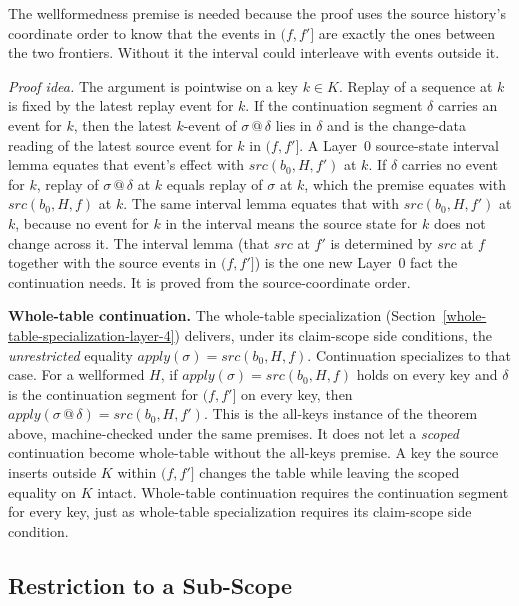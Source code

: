 \documentclass[letterpaper,10pt,twocolumn]{article}
\newcommand{\Apply}{\mathit{apply}}
\newcommand{\Src}{\mathit{src}}
\begin{document}
The wellformedness premise is needed because the proof uses the
source history's coordinate order to know that the events in $(f,f']$
are exactly the ones between the two frontiers. Without it the interval
could interleave with events outside it.

\emph{Proof idea.} The argument is pointwise on a key $k \in K$. Replay
of a sequence at $k$ is fixed by the latest replay event for $k$. If the
continuation segment $\delta$ carries an event for $k$, then the latest
$k$-event of $\sigma \mathbin{@} \delta$ lies in $\delta$ and is the
change-data reading of the latest source event for $k$ in $(f,f']$. A
Layer~0 source-state interval lemma equates that event's effect with
$\Src(b_0,H,f')$ at $k$. If $\delta$ carries no event for $k$, replay of
$\sigma \mathbin{@} \delta$ at $k$ equals replay of $\sigma$ at $k$,
which the premise equates with $\Src(b_0,H,f)$ at $k$. The same interval
lemma equates that with $\Src(b_0,H,f')$ at $k$, because no event for
$k$ in the interval means the source state for $k$ does not change
across it. The interval lemma (that $\Src$ at $f'$ is determined by
$\Src$ at $f$ together with the source events in $(f,f']$) is the one
new Layer~0 fact the continuation needs. It is proved from the
source-coordinate order.

\smallskip
\noindent\textbf{Whole-table continuation.} The whole-table
specialization (Section~\ref{whole-table-specialization-layer-4})
delivers, under its claim-scope side conditions, the \emph{unrestricted}
equality $\Apply(\sigma) = \Src(b_0,H,f)$. Continuation specializes to
that case. For a wellformed $H$, if $\Apply(\sigma) = \Src(b_0,H,f)$
holds on every key and $\delta$ is the continuation segment for
$(f,f']$ on every key, then
$\Apply(\sigma \mathbin{@} \delta) = \Src(b_0,H,f')$. This is the
all-keys instance of the theorem above, machine-checked under the same
premises. It does not let a \emph{scoped} continuation become
whole-table without the all-keys premise. A key the source inserts outside $K$ within
$(f,f']$ changes the table while leaving the scoped equality on $K$
intact. Whole-table continuation requires the continuation segment for
every key, just as whole-table specialization requires its claim-scope
side condition.

\subsection{Restriction to a
Sub-Scope}\label{restriction-to-a-sub-scope}
\end{document}
